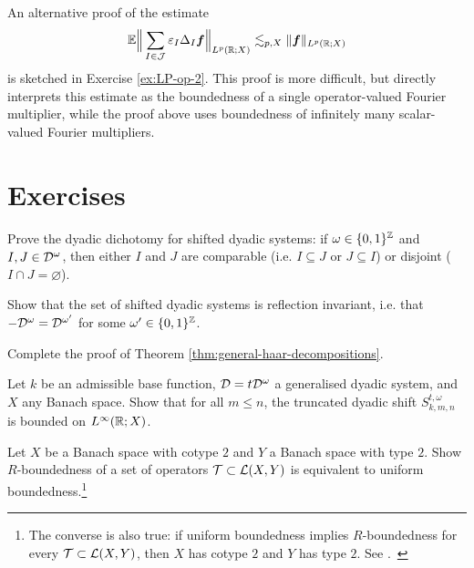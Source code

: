An alternative proof of the estimate
\begin{equation*}
  \mathbb{E}\Big\| \sum_{I \in \mathcal{J}} \varepsilon_{I} \Delta_{I} \bm{f} \Big\|_{L^p(\mathbb{R};X)} \lesssim_{p,X} \|\bm{f}\|_{L^p(\mathbb{R};X)}
\end{equation*}
is sketched in Exercise \ref{ex:LP-op-2}.
This proof is more difficult, but directly interprets this estimate as the boundedness of a single operator-valued Fourier multiplier, while the proof above uses boundedness of infinitely many scalar-valued Fourier multipliers.

\section{Exercises}

\begin{exercise}\label{ex:dyadic-dichotomy}
  Prove the dyadic dichotomy for shifted dyadic systems: if $\omega \in \{0,1\}^{\mathbb{Z}}$ and $I,J \in \mathcal{D}^{\omega}$, then either $I$ and $J$ are comparable (i.e. $I \subseteq J$ or $J \subseteq I$) or disjoint ($I \cap J = \varnothing$).
\end{exercise}

\begin{exercise}\label{ex:dyadic-refln-invariance}
  Show that the set of shifted dyadic systems is reflection invariant, i.e. that $-\mathcal{D}^{\omega} = \mathcal{D}^{\omega'}$ for some $\omega' \in \{0,1\}^{\mathbb{Z}}$.
\end{exercise}

\begin{exercise}\label{ex:mgale-reduction}
  Complete the proof of Theorem \ref{thm:general-haar-decompositions}.
\end{exercise}

\begin{exercise}
  Let $k$ be an admissible base function, $\mathcal{D} = t\mathcal{D}^{\omega}$ a generalised dyadic system, and $X$ any Banach space.
  Show that for all $m \leq n$, the truncated dyadic shift $S_{k,m,n}^{t,\omega}$ is bounded on $L^\infty(\mathbb{R};X)$.
\end{exercise}

\begin{exercise}\label{ex:R-bound-type}
  Let $X$ be a Banach space with cotype $2$ and $Y$ a Banach space with type $2$.
  Show $R$-boundedness of a set of operators $\mathcal{T} \subset \mathcal{L}(X,Y)$ is equivalent to uniform boundedness.\footnote{The converse is also true: if uniform boundedness implies $R$-boundedness for every $\mathcal{T} \subset \mathcal{L}(X,Y)$, then $X$ has cotype $2$ and $Y$ has type $2$. See \cite[Proposition 8.6.1]{HNVW17}.\ }
\end{exercise}


